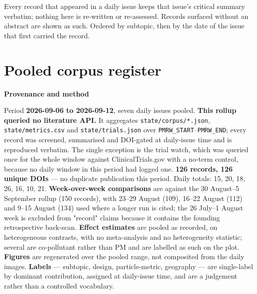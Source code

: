 \documentclass[10pt]{article}
\begin{document}
{\fontsize{7.4}{9}\selectfont\color{Slate}Every record that appeared in a daily issue
keeps that issue's critical summary verbatim; nothing here is re-written or re-assessed.
Records surfaced without an abstract are shown as such. Ordered by subtopic, then by the
date of the issue that first carried the record.\par}



\section*{\sffamily\bfseries\color{Deep}Pooled corpus register}
\vspace{-1.5mm}{\color{Teal}\rule{\linewidth}{1.1pt}}\vspace{2.5mm}



\vspace{4mm}
\begin{keybox}
{\sffamily\bfseries\footnotesize\color{Deep}Provenance and method}\\[1.2mm]
{\fontsize{7.2}{8.8}\selectfont
Period \textbf{2026-09-06 to 2026-09-12}, seven daily issues pooled.
\textbf{This rollup queried no literature API.} It aggregates \texttt{state/corpus/*.json},
\texttt{state/metrics.csv} and \texttt{state/trials.json} over
\texttt{PMRW\_START}--\texttt{PMRW\_END}; every record was screened, summarised and
DOI-gated at daily-issue time and is reproduced verbatim. The single exception is the
trial watch, which was queried once for the whole window against ClinicalTrials.gov with a
no-term control, because no daily window in this period had logged one.
\textbf{126 records, 126 unique DOIs} --- no duplicate publication this period. Daily
totals: 15, 20, 18, 26, 16, 10, 21. \textbf{Week-over-week comparisons} are against the
30 August--5 September rollup (150 records), with 23--29 August (109), 16--22 August (112)
and 9--15 August (134) used where a longer run is cited; the 26 July--1 August week is
excluded from "record" claims because it contains the founding retrospective back-scan.
\textbf{Effect estimates} are pooled as recorded, on heterogeneous contrasts, with no
meta-analysis and no heterogeneity statistic; several are co-pollutant rather than PM and
are labelled as such on the plot. \textbf{Figures} are regenerated over the pooled range,
not composited from the daily images. \textbf{Labels} --- subtopic, design, particle-metric,
geography --- are single-label by dominant contribution, assigned at daily-issue time, and
are a judgement rather than a controlled vocabulary.\par}
\end{keybox}
\end{document}
